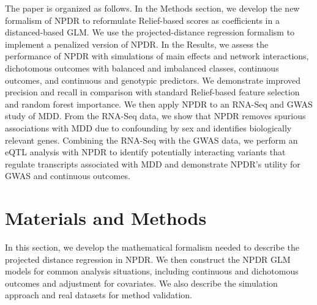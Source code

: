\documentclass{bioinfo}
\begin{document}
The paper is organized as follows.
In the Methods section, we develop the new formalism of NPDR to reformulate Relief-based scores as coefficients in a distanced-based GLM.
We use the projected-distance regression formalism to implement a penalized version of NPDR.
In the Results, we assess the performance of NPDR with simulations of main effects and network interactions, dichotomous outcomes with balanced and imbalanced classes, continuous outcomes, and continuous and genotypic predictors. We demonstrate improved precision and recall in comparison with standard Relief-based feature selection and random forest importance.
We then apply NPDR to an RNA-Seq and GWAS study of MDD.
From the RNA-Seq data, we show that NPDR removes spurious associations with MDD due to confounding by sex and identifies biologically relevant genes.
Combining the RNA-Seq with the GWAS data, we perform an eQTL analysis with NPDR to identify potentially interacting variants that regulate transcripts associated with MDD and demonstrate NPDR's utility for GWAS and continuous outcomes.



\section{Materials and Methods}
In this section, we develop the mathematical formalism needed to describe the projected distance regression in NPDR.
We then construct the NPDR GLM models for common analysis situations, including continuous and dichotomous outcomes and adjustment for covariates.
We also describe the simulation approach and real datasets for method validation.

\def\ri{R_i}
\def\rj{R_j}
\def\kmi{k_{M_i}}
\def\khi{k_{H_i}}
\def\hji{H_{j_i}}
\def\ma{\overline{M}_a}
\def\ha{\overline{H}_a}
\def\mnu{M_\nu}
\def\hnu{H_\nu}
\def\myd{\text{diff}}
\def\ka{\bar{k}_\alpha}
\end{document}

